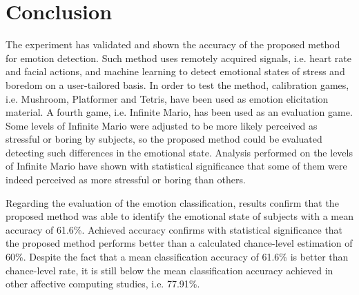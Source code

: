 


\section{Conclusion}

The experiment has validated and shown the accuracy of the proposed method for emotion detection. Such method uses remotely acquired signals, i.e. heart rate and facial actions, and machine learning to detect emotional states of stress and boredom on a user-tailored basis. In order to test the method, calibration games, i.e. Mushroom, Platformer and Tetris, have been used as emotion elicitation material. A fourth game, i.e. Infinite Mario, has been used as an evaluation game. Some levels of Infinite Mario were adjusted to be more likely perceived as stressful or boring by subjects, so the proposed method could be evaluated detecting such differences in the emotional state. Analysis performed on the levels of Infinite Mario have shown with statistical significance that some of them were indeed perceived as more stressful or boring than others.

Regarding the evaluation of the emotion classification, results confirm that the proposed method was able to identify the emotional state of subjects with a mean accuracy of 61.6\%. Achieved accuracy confirms with statistical significance that the proposed method performs better than a calculated chance-level estimation of 60\%. Despite the fact that a mean classification accuracy of 61.6\% is better than chance-level rate, it is still below the mean classification accuracy achieved in other affective computing studies, i.e. 77.91\%.

